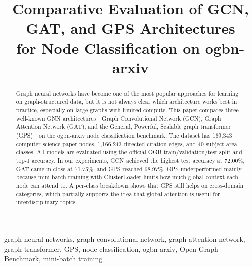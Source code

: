 \documentclass[conference]{IEEEtran}
\begin{document}
\title{Comparative Evaluation of GCN, GAT, and GPS Architectures\\
for Node Classification on ogbn-arxiv}

\author{
\and
{}
}

\maketitle

\begin{abstract}
Graph neural networks have become one of the most popular approaches for learning on
graph-structured data, but it is not always clear which architecture works best in practice,
especially on large graphs with limited compute. This paper compares three well-known GNN
architectures---Graph Convolutional Network (GCN), Graph Attention Network (GAT), and the
General, Powerful, Scalable graph transformer (GPS)---on the ogbn-arxiv node classification
benchmark. The dataset has 169,343 computer-science paper nodes, 1,166,243 directed citation
edges, and 40 subject-area classes. All models are evaluated using the official OGB
train/validation/test split and top-1 accuracy. In our experiments, GCN achieved the highest
test accuracy at 72.00\%, GAT came in close at 71.75\%, and GPS reached 68.97\%. GPS
underperformed mainly because mini-batch training with ClusterLoader limits how much global
context each node can attend to. A per-class breakdown shows that GPS still helps on
cross-domain categories, which partially supports the idea that global attention is useful
for interdisciplinary topics.
\end{abstract}

\begin{IEEEkeywords}
graph neural networks, graph convolutional network, graph attention network, graph transformer,
GPS, node classification, ogbn-arxiv, Open Graph Benchmark, mini-batch training
\end{IEEEkeywords}
\end{document}
